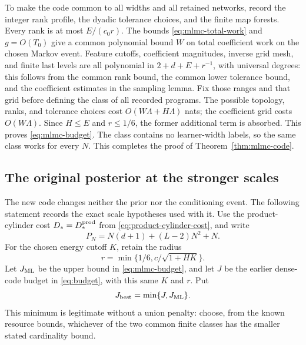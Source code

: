 To make the code common to all widths and all retained networks, record
the integer rank profile, the dyadic tolerance choices, and the finite
map forests. Every rank is at most $E/(c_0r)$. The bounds
\eqref{eq:mlmc-total-work} and $g=O(T_0)$ give a common polynomial bound
$W$ on total coefficient work on the chosen Markov event. Feature
cutoffs, coefficient magnitudes, inverse grid mesh, and finite last
levels are all polynomial in $2+d+E+r^{-1}$, with universal degrees:
this follows from the common rank bound, the common lower tolerance
bound, and the coefficient estimates in the sampling lemma. Fix those
ranges and that grid before defining the class of all recorded programs.
The possible topology, ranks, and tolerance choices cost
$O(W\Lambda+H\Lambda)$ nats; the coefficient grid costs $O(W\Lambda)$.
Since $H\le E$ and $r\le1/6$, the former additional term is absorbed.
This proves \eqref{eq:mlmc-budget}. The class contains no learner-width labels,
so the same class works for every $N$. This completes the proof of
Theorem~\ref{thm:mlmc-code}.

\subsection{The original posterior at the stronger scales}
\label{sec:mlmc-posterior}

The new code changes neither the prior nor the conditioning event.
The following statement records the exact scale hypotheses used with it.
Use the product-cylinder cost
$D_*=D_*^{\rm prod}$ from \eqref{eq:product-cylinder-cost}, and
write
\[
 P_N=N(d+1)+(L-2)N^2+N.
\]
For the chosen energy cutoff $K$, retain the radius
\[
 r=\min\{1/6,c/\sqrt{1+HK}\}.
\]
Let $J_{\rm ML}$ be the upper bound in \eqref{eq:mlmc-budget}, and let
$J$ be the earlier dense-code budget in \eqref{eq:budget}, with this same
$K$ and $r$. Put
\[
 J_{\rm best}=\min\{J,J_{\rm ML}\}.
\]
This minimum is legitimate without a union penalty: choose, from the
known resource bounds, whichever of the two common finite classes has
the smaller stated cardinality bound.

